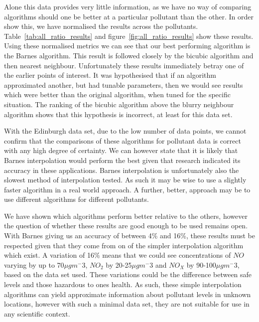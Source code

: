 
		Alone this data provides very little information, as we have no way of comparing algorithms should one be better at a particular pollutant than the other. In order show this, we have normalised the results across the pollutants. Table~\ref{tab:all_ratio_results} and figure~\ref{fig:all_ratio_results} show these results. Using these normalised metrics we can see that our best performing algorithm is the Barnes algorithm. This result is followed closely by the bicubic algorithm and then nearest neighbour. Unfortunately these results immediately betray one of the earlier points of interest. It was hypothesised that if an algorithm approximated another, but had tunable parameters, then we would see results which were better than the original algorithm, when tuned for the specific situation. The ranking of the bicubic algorithm above the blurry neighbour algorithm shows that this hypothesis is incorrect, at least for this data set. 

		With the Edinburgh data set, due to the low number of data points, we cannot confirm that the comparisons of these algorithms for pollutant data is correct with any high degree of certainty. We can however state that it is likely that Barnes interpolation would perform the best given that research indicated its accuracy in these applications. Barnes interpolation is unfortunately also the slowest method of interpolation tested. As such it may be wise to use a slightly faster algorithm in a real world approach. A further, better, approach may be to use different algorithms for different pollutants.

		We have shown which algorithms perform better relative to the others, however the question of whether these results are good enough to be used remains open. With Barnes giving us an accuracy of between 4\% and 16\%, these results must be respected given that they come from on of the simpler interpolation algorithm which exist. A variation of 16\% means that we could see concentrations of $NO$ varying by up to 70$\mu gm^-3$, $NO_{2}$ by 20-25$\mu gm^-3$ and $NO_{X}$ by 90-100$\mu gm^-3$, based on the data set used. These variations could be the difference between safe levels and those hazardous to ones health. As such, these simple interpolation algorithms can yield approximate information about pollutant levels in unknown locations, however with such a minimal data set, they are not suitable for use in any scientific context. 
